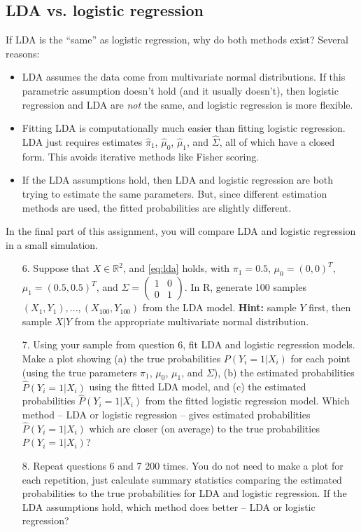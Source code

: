 \documentclass[11pt]{article}
\begin{document}
\subsection*{LDA vs. logistic regression}
If LDA is the ``same'' as logistic regression, why do both methods exist? Several reasons:
\begin{itemize}
\item LDA assumes the data come from multivariate normal distributions. If this parametric assumption doesn't hold (and it usually doesn't), then logistic regression and LDA are \textit{not} the same, and logistic regression is more flexible.

\item Fitting LDA is computationally much easier than fitting logistic regression. LDA just requires estimates $\widehat{\pi}_1$, $\widehat{\mu}_0$, $\widehat{\mu}_1$, and $\widehat{\Sigma}$, all of which have a closed form. This avoids iterative methods like Fisher scoring.

\item If the LDA assumptions hold, then LDA and logistic regression are both trying to estimate the same parameters. But, since different estimation methods are used, the fitted probabilities are slightly different.
\end{itemize}
In the final part of this assignment, you will compare LDA and logistic regression in a small simulation.

\begin{enumerate}
\item[6.] Suppose that $X \in \mathbb{R}^2$, and \eqref{eq:lda} holds, with $\pi_1 = 0.5$, $\mu_0 = (0, 0)^T$, $\mu_1 = (0.5, 0.5)^T$, and $\Sigma = \begin{pmatrix}
1 & 0 \\ 0 & 1
\end{pmatrix}$. In R, generate 100 samples $(X_1, Y_1),...,(X_{100}, Y_{100})$ from the LDA model. \textbf{Hint:} sample $Y$ first, then sample $X|Y$ from the appropriate multivariate normal distribution.

\item[7.] Using your sample from question 6, fit LDA and logistic regression models. Make a plot showing (a) the true probabilities $P(Y_i = 1 | X_i)$ for each point (using the true parameters $\pi_1$, $\mu_0$, $\mu_1$, and $\Sigma$), (b) the estimated probabilities $\widehat{P}(Y_i = 1 | X_i)$ using the fitted LDA model, and (c) the estimated probabilities $\widehat{P}(Y_i = 1 | X_i)$ from the fitted logistic regression model. Which method -- LDA or logistic regression -- gives estimated probabilities $\widehat{P}(Y_i = 1 | X_i)$ which are closer (on average) to the true probabilities $P(Y_i = 1 | X_i)$?

\item[8.] Repeat questions 6 and 7 200 times. You do not need to make a plot for each repetition, just calculate summary statistics comparing the estimated probabilities to the true probabilities for LDA and logistic regression. If the LDA assumptions hold, which method does better -- LDA or logistic regression?
\end{enumerate}
\end{document}
